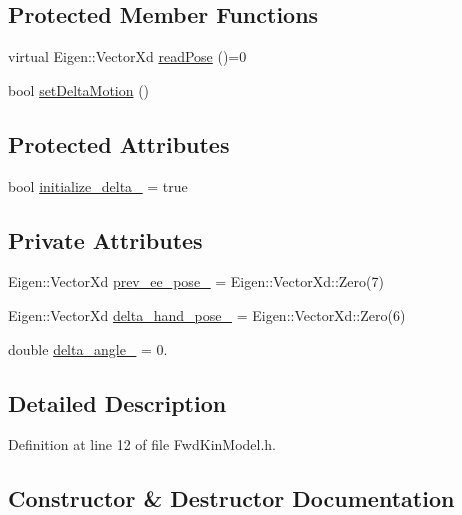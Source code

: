 \subsection*{Protected Member Functions}
\begin{DoxyCompactItemize}
\item 
virtual Eigen\+::\+Vector\+Xd \hyperlink{classFwdKinModel_aaad9ff96f725fc529672e12aed86dc02}{read\+Pose} ()=0
\item 
bool \hyperlink{classFwdKinModel_a12b54bd62ba5cf218973c600c66ba39e}{set\+Delta\+Motion} ()
\end{DoxyCompactItemize}
\subsection*{Protected Attributes}
\begin{DoxyCompactItemize}
\item 
bool \hyperlink{classFwdKinModel_a2ed7b77ebd710e5debe63b83a34a1645}{initialize\+\_\+delta\+\_\+} = true
\end{DoxyCompactItemize}
\subsection*{Private Attributes}
\begin{DoxyCompactItemize}
\item 
Eigen\+::\+Vector\+Xd \hyperlink{classFwdKinModel_a45262d07057de0c165eae2d425890505}{prev\+\_\+ee\+\_\+pose\+\_\+} = Eigen\+::\+Vector\+Xd\+::\+Zero(7)
\item 
Eigen\+::\+Vector\+Xd \hyperlink{classFwdKinModel_a508ba314e35ba5ce3efb4a48d76e7fa0}{delta\+\_\+hand\+\_\+pose\+\_\+} = Eigen\+::\+Vector\+Xd\+::\+Zero(6)
\item 
double \hyperlink{classFwdKinModel_a17b3e7f99cfdfdc9890ff81d1a162e7e}{delta\+\_\+angle\+\_\+} = 0.
\end{DoxyCompactItemize}


\subsection{Detailed Description}


Definition at line 12 of file Fwd\+Kin\+Model.\+h.



\subsection{Constructor \& Destructor Documentation}
\mbox{\label{classFwdKinModel_aff57436563440b831b701b7b9633ab9b}} 
